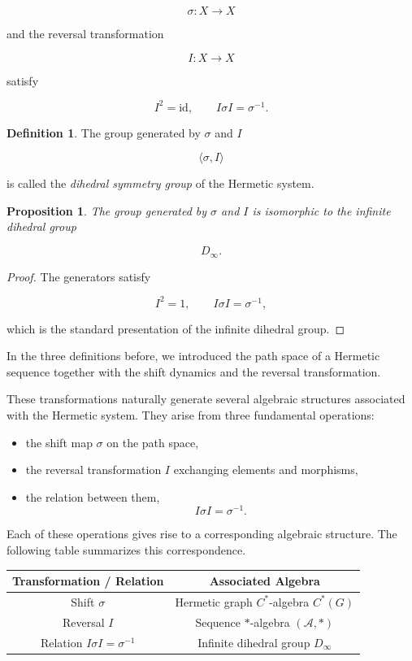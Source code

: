 \documentclass[11pt]{book}
\theoremstyle{definition}
\newtheorem{definition}{Definition}[section]
\theoremstyle{plain}
\newtheorem{proposition}[theorem]{Proposition}
\theoremstyle{remark}
\begin{document}
\[
\sigma : X \to X
\]

and the reversal transformation

\[
I : X \to X
\]

satisfy

\[
I^2=\mathrm{id}, \qquad
I\sigma I=\sigma^{-1}.
\]

\begin{definition}
The group generated by $\sigma$ and $I$

\[
\langle \sigma , I \rangle
\]

is called the \emph{dihedral symmetry group}
of the Hermetic system.
\end{definition}

\begin{proposition}
The group generated by $\sigma$ and $I$ is
isomorphic to the infinite dihedral group

\[
D_\infty .
\]
\end{proposition}

\begin{proof}
The generators satisfy

\[
I^2=1, \qquad I\sigma I=\sigma^{-1},
\]

which is the standard presentation of the
infinite dihedral group.
\end{proof}

In the three definitions before, we introduced the path space
of a Hermetic sequence together with the shift dynamics
and the reversal transformation.

These transformations naturally generate several
algebraic structures associated with the Hermetic system.
They arise from three fundamental operations:

\begin{itemize}
\item the shift map $\sigma$ on the path space,
\item the reversal transformation $I$ exchanging elements
and morphisms,
\item the relation between them,
\[
I\sigma I = \sigma^{-1}.
\]
\end{itemize}

Each of these operations gives rise to a corresponding
algebraic structure. The following table summarizes
this correspondence.

\begin{center}
\begin{tabular}{c|c}
Transformation / Relation & Associated Algebra \\ \hline

Shift $\sigma$ & Hermetic graph $C^*$-algebra $C^*(G)$ \\

Reversal $I$ & Sequence $*$-algebra $(\mathcal A,*)$ \\

Relation $I\sigma I=\sigma^{-1}$ & Infinite dihedral group $D_\infty$

\end{tabular}
\end{center}
\end{document}
